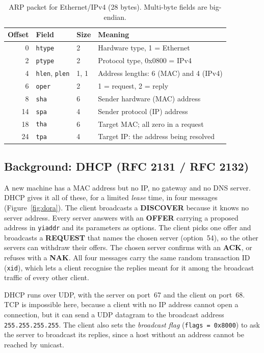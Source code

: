 \documentclass[11pt]{article}
\begin{document}
\begin{table}[H]
\centering
\small
\begin{tabular}{rllp{7.4cm}}
\toprule
\textbf{Offset} & \textbf{Field} & \textbf{Size} & \textbf{Meaning} \\
\midrule
0  & \texttt{htype} & 2 & Hardware type, 1 = Ethernet \\
2  & \texttt{ptype} & 2 & Protocol type, 0x0800 = IPv4 \\
4  & \texttt{hlen}, \texttt{plen} & 1, 1 & Address lengths: 6 (MAC) and 4 (IPv4) \\
6  & \texttt{oper} & 2 & 1 = request, 2 = reply \\
8  & \texttt{sha} & 6 & Sender hardware (MAC) address \\
14 & \texttt{spa} & 4 & Sender protocol (IP) address \\
18 & \texttt{tha} & 6 & Target MAC; all zero in a request \\
24 & \texttt{tpa} & 4 & Target IP: the address being resolved \\
\bottomrule
\end{tabular}
\caption{ARP packet for Ethernet/IPv4 (28 bytes). Multi-byte fields are big-endian.}
\label{tab:arppkt}
\end{table}

\subsection{Background: DHCP (RFC 2131 / RFC 2132)}
A new machine has a MAC address but no IP, no gateway and no DNS server. DHCP gives it all
of these, for a limited \emph{lease} time, in four messages (Figure~\ref{fig:dora}). The
client broadcasts a \textbf{DISCOVER} because it knows no server address. Every server
answers with an \textbf{OFFER} carrying a proposed address in \texttt{yiaddr} and its
parameters as options. The client picks one offer and broadcasts a \textbf{REQUEST} that
names the chosen server (option~54), so the other servers can withdraw their offers. The
chosen server confirms with an \textbf{ACK}, or refuses with a \textbf{NAK}. All four
messages carry the same random transaction ID (\texttt{xid}), which lets a client
recognise the replies meant for it among the broadcast traffic of every other client.

DHCP runs over UDP, with the server on port~67 and the client on port~68. TCP is
impossible here, because a client with no IP address cannot open a connection, but it can
send a UDP datagram to the broadcast address \texttt{255.255.255.255}. The client also
sets the \emph{broadcast flag} (\texttt{flags = 0x8000}) to ask the server to broadcast its
replies, since a host without an address cannot be reached by unicast.
\end{document}
